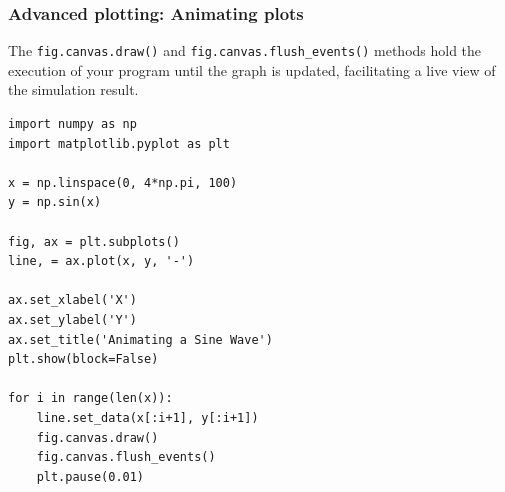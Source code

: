 \begin{frame}[fragile]
  \frametitle{Advanced plotting: Animating plots}
  The \lstinline|fig.canvas.draw()| and \lstinline|fig.canvas.flush_events()| methods hold the execution of your program until the graph is updated, facilitating a live view of the simulation result.
  \begin{lstlisting}
import numpy as np
import matplotlib.pyplot as plt

x = np.linspace(0, 4*np.pi, 100)
y = np.sin(x)

fig, ax = plt.subplots()
line, = ax.plot(x, y, '-')

ax.set_xlabel('X')
ax.set_ylabel('Y')
ax.set_title('Animating a Sine Wave')
plt.show(block=False)

for i in range(len(x)):
    line.set_data(x[:i+1], y[:i+1])
    fig.canvas.draw()
    fig.canvas.flush_events()
    plt.pause(0.01)
  \end{lstlisting}
\end{frame}



